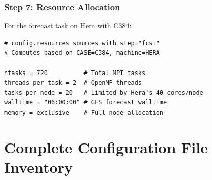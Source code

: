 \documentclass[11pt,letterpaper]{article}
\begin{document}
\subsubsection{Step 7: Resource Allocation}

For the forecast task on Hera with C384:

\begin{lstlisting}[style=bashstyle, title=Resource Resolution]
# config.resources sources with step="fcst"
# Computes based on CASE=C384, machine=HERA

ntasks = 720          # Total MPI tasks
threads_per_task = 2  # OpenMP threads
tasks_per_node = 20   # Limited by Hera's 40 cores/node
walltime = "06:00:00" # GFS forecast walltime
memory = exclusive    # Full node allocation
\end{lstlisting}


\appendix

\section{Complete Configuration File Inventory}
\label{app:config-inventory}
\end{document}
